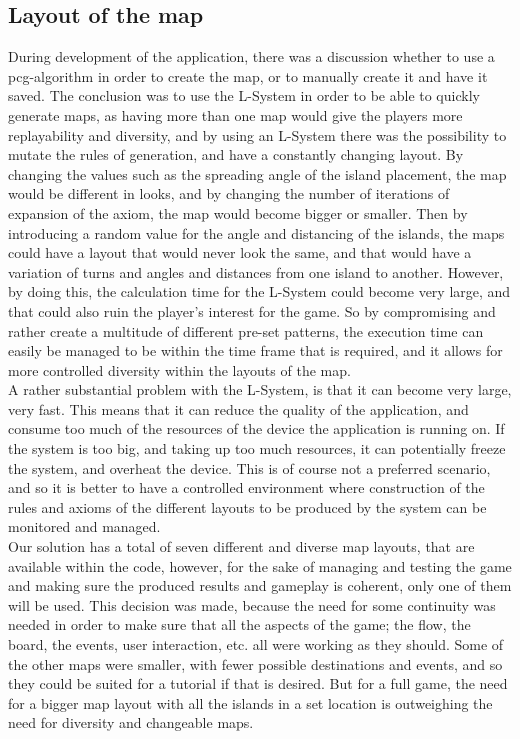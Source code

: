 \subsection{Layout of the map}
During development of the application, there was a discussion whether to use a pcg-algorithm in order to create the map, or to manually create it and have it saved. The conclusion was to use the L-System in order to be able to quickly generate maps, as having more than one map would give the players more replayability and diversity, and by using an L-System there was the possibility to mutate the rules of generation, and have a constantly changing layout. By changing the values such as the spreading angle of the island placement, the map would be different in looks, and by changing the number of iterations of expansion of the axiom, the map would become bigger or smaller. Then by introducing a random value for the angle and distancing of the islands, the maps could have a layout that would never look the same, and that would have a variation of turns and angles and distances from one island to another. However, by doing this, the calculation time for the L-System could become very large, and that could also ruin the player's interest for the game. So by compromising and rather create a multitude of different pre-set patterns, the execution time can easily be managed to be within the time frame that is required, and it allows for more controlled diversity within the layouts of the map.\\

A rather substantial problem with the L-System, is that it can become very large, very fast. This means that it can reduce the quality of the application, and consume too much of the resources of the device the application is running on. If the system is too big, and taking up too much resources, it can potentially freeze the system, and overheat the device. This is of course not a preferred scenario, and so it is better to have a controlled environment where construction of the rules and axioms of the different layouts to be produced by the system can be monitored and managed.\\

Our solution has a total of seven different and diverse map layouts, that are available within the code, however, for the sake of managing and testing the game and making sure the produced results and gameplay is coherent, only one of them will be used. This decision was made, because the need for some continuity was needed in order to make sure that all the aspects of the game; the flow, the board, the events, user interaction, etc. all were working as they should. 
Some of the other maps were smaller, with fewer possible destinations and events, and so they could be suited for a tutorial if that is desired. But for a full game, the need for a bigger map layout with all the islands in a set location is outweighing the need for diversity and changeable maps.


